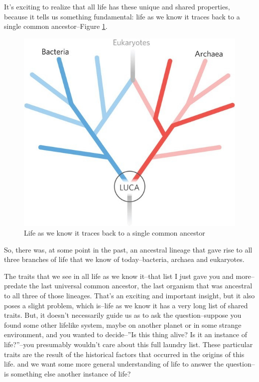 \documentclass[]{article}
\begin{document}
It's exciting to realize that all life has these unique and shared properties, because it tells us something fundamental: life as we know it traces back to a single common ancestor--Figure \ref{fig:LUCA_common}.
\begin{figure}[H]
	\caption{Life as we know it traces back to a single common ancestor}\label{fig:LUCA_common} 
	\includegraphics[width=\textwidth]{LUCA_common}
\end{figure}
So, there was, at some point in the past, an ancestral lineage that gave rise to
all three branches of life that we know of today--bacteria, archaea and eukaryotes.

The traits that we see in all life as we know it--that list I just gave you and more--predate the last universal common ancestor, the last organism that was ancestral to all three of those lineages.
That's an exciting and important insight, but it also poses a slight problem, which is--life as we know it has a very long list of shared traits.
But, it doesn't necessarily guide us as to ask the question--suppose you found some other lifelike system, maybe on another planet or in some strange environment, and you wanted to decide--''Is this thing alive? Is it an instance of life?''--you presumably wouldn't care about this full laundry list. These particular traits are the result of the historical factors that occurred in the origins of this life. and we want some more general understanding of life to answer the question--is something else another instance of life?
\end{document}
